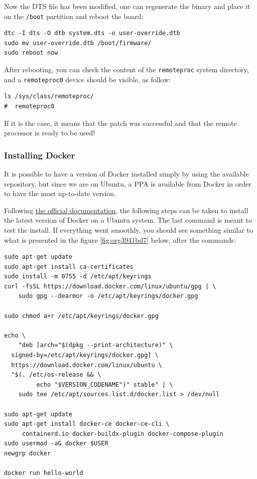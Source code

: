 \documentclass[10pt]{article}
\begin{document}
Now the DTS file has been modified, one can regenerate the binary and place it on the \texttt{/boot} partition
and reboot the board:

\begin{verbatim}
dtc -I dts -O dtb system.dts -o user-override.dtb
sudo mv user-override.dtb /boot/firmware/
sudo reboot now
\end{verbatim}

After rebooting, you can check the content of the \verb|remoteproc| system directory,
and a \texttt{remoteproc0} device should be visible, as follow:

\begin{verbatim}
ls /sys/class/remoteproc/
#  remoteproc0
\end{verbatim}

If it is the case, it means that the patch was successful and  that the remote processor is
ready to be used!
\pagebreak

\subsubsection{Installing Docker}
\label{sec:org4fe5214}
It is possible to have a version of Docker installed simply by using the available repository,
but since we are on Ubuntu, a PPA is available from Docker in order to have the most up-to-date version.

Following \href{https://docs.docker.com/engine/install/ubuntu/\#install-using-the-repository}{the official documentation}, the following steps can be taken to install the latest version of
Docker on a Ubuntu system. The last command is meant to test the install.
If everything went smoothly, you should see something similar to what is presented
in the figure \ref{fig:org3941bd7} below, after the commands:

\begin{verbatim}
sudo apt-get update
sudo apt-get install ca-certificates
sudo install -m 0755 -d /etc/apt/keyrings
curl -fsSL https://download.docker.com/linux/ubuntu/gpg | \
    sudo gpg --dearmor -o /etc/apt/keyrings/docker.gpg

sudo chmod a+r /etc/apt/keyrings/docker.gpg

echo \
    "deb [arch="$(dpkg --print-architecture)" \
  signed-by=/etc/apt/keyrings/docker.gpg] \
  https://download.docker.com/linux/ubuntu \
  "$(. /etc/os-release && \
         echo "$VERSION_CODENAME")" stable" | \
    sudo tee /etc/apt/sources.list.d/docker.list > /dev/null

sudo apt-get update
sudo apt-get install docker-ce docker-ce-cli \
     containerd.io docker-buildx-plugin docker-compose-plugin
sudo usermod -aG docker $USER
newgrp docker

docker run hello-world
\end{verbatim}
\end{document}
